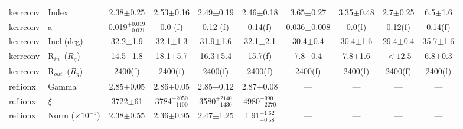 \documentclass{aa}
\begin{document}
\begin{appendix}
\begin{sidewaystable*}
\begin{tabular}{llcccccccc}
\hline

kerrconv & 
Index   & 
2.38$\pm$0.25 &
2.53$\pm$0.16&
2.49$\pm$0.19 &
2.46$\pm$0.18 &
3.65$\pm$0.27 &
3.35$\pm$0.48 &
2.7$\pm$0.25&
6.5$\pm$1.6 \\












kerrconv & 
a   & 
0.019$^{+0.019}_{-0.021}$ &
0.0 (f) &
0.12 (f) &
0.14(f) &
0.036$\pm$0.008  &
0.0(f) &
0.12(f) &
0.14(f)\\



kerrconv & 
Incl (deg)   & 
32.2$\pm$1.9 &
32.1$\pm$1.3 &
31.9$\pm$1.6 &
32.1$\pm$2.1 &
30.4$\pm$0.4 &
30.4$\pm$1.6 &
29.4$\pm$0.4&
35.7$\pm$1.6 \\


kerrconv & 
R$_{in}\,$ ($R_g$) &
14.5$\pm$1.8 & 
18.1$\pm$5.7&
16.3$\pm$5.4&
15.7(f)&
7.8$\pm$0.4&
7.8$\pm$1.6 &
$ < 12.5$ &
6.8$\pm$0.3\\


kerrconv & 
R$_{out}\,$ ($R_g$)  & 
2400(f) & 
2400(f) &
2400(f) &
2400(f) &
2400(f) &
2400(f) &
2400(f) &
2400(f)\\





\hline 


reflionx & 
Gamma   & 
2.85$\pm$0.05 &
2.86$\pm$0.05 &
2.85$\pm$0.12 &
2.87$\pm$0.08&
--- &
--- &
--- &
--- \\





reflionx & 
$\xi$   & 
3722$\pm$61&
3784$^{+2050}_{-1100}$ &
3580$^{+2140}_{-1430}$ &
4980$^{+990}_{-2270}$ &
--- &
--- &
--- &
--- \\


reflionx & 
Norm ($\times10^{-5}$)   & 
2.38$\pm$0.55 &
2.36$\pm$0.95 &
2.47$\pm$1.25 &
1.91$^{+1.62}_{-0.58}$ &
--- &
--- &
--- &
--- \\







\end{tabular}
\end{sidewaystable*}
\end{appendix}
\end{document}
